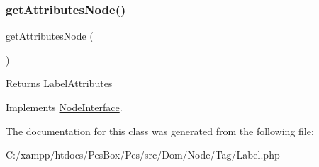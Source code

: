 \subsubsection{\texorpdfstring{get\+Attributes\+Node()}{getAttributesNode()}}
{\footnotesize\ttfamily get\+Attributes\+Node (\begin{DoxyParamCaption}{ }\end{DoxyParamCaption})}

\begin{DoxyReturn}{Returns}
Label\+Attributes 
\end{DoxyReturn}


Implements \mbox{\hyperlink{interface_pes_1_1_dom_1_1_node_1_1_node_interface_a4722e7722b245351681b05d35f6694f3}{Node\+Interface}}.



The documentation for this class was generated from the following file\+:\begin{DoxyCompactItemize}
\item 
C\+:/xampp/htdocs/\+Pes\+Box/\+Pes/src/\+Dom/\+Node/\+Tag/Label.\+php\end{DoxyCompactItemize}
